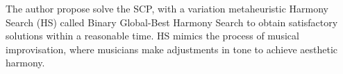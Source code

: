 The author propose solve the SCP, with a variation metaheuristic Harmony Search (HS) called Binary Global-Best Harmony Search to obtain satisfactory solutions within a reasonable time. HS mimics the process of musical improvisation, where musicians make adjustments in tone to achieve aesthetic harmony.